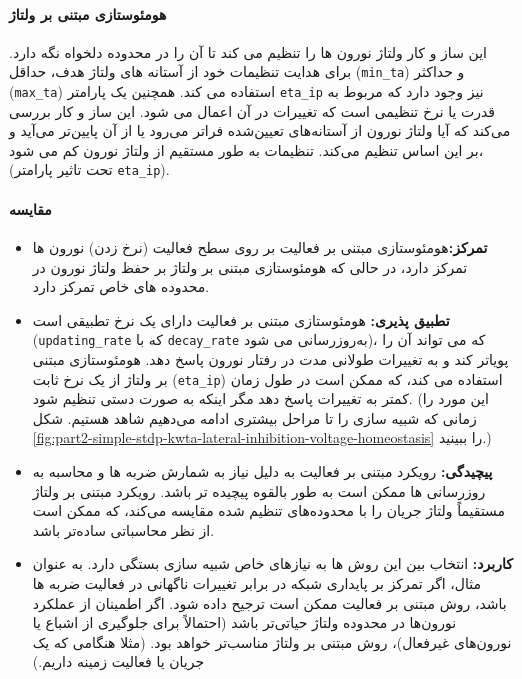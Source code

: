             \paragraph*{هومئوستازی مبتنی بر ولتاژ}
            این ساز و کار ولتاژ نورون ها را تنظیم می کند تا آن را در محدوده دلخواه نگه دارد. برای هدایت تنظیمات خود از آستانه های ولتاژ هدف، حداقل
            (\texttt{min\_ta})
            و حداکثر
            (\texttt{max\_ta})
            استفاده می کند. همچنین یک پارامتر 
            \texttt{eta\_ip} 
            نیز وجود دارد که مربوط به قدرت یا نرخ تنظیمی است که تغییرات در آن اعمال می شود. این ساز و کار بررسی می‌کند که آیا ولتاژ نورون از آستانه‌های تعیین‌شده فراتر می‌رود یا از آن پایین‌تر می‌آید و بر این اساس تنظیم می‌کند. تنظیمات به طور مستقیم از ولتاژ نورون کم می شود، 
            (تحت تاثیر پارامتر 
            \texttt{eta\_ip}).

            \paragraph*{مقایسه}
            \begin{itemize}
                \item \textbf{تمرکز:}هومئوستازی مبتنی بر فعالیت بر روی سطح فعالیت 
                (نرخ زدن) 
                نورون ها تمرکز دارد، در حالی که هومئوستازی مبتنی بر ولتاژ بر حفظ ولتاژ نورون در محدوده های خاص تمرکز دارد.
                \item \textbf{تطبیق پذیری:} هومئوستازی مبتنی بر فعالیت دارای یک نرخ تطبیقی ​​است 
                (\texttt{updating\_rate}
                که با 
                \texttt{decay\_rate} 
                به‌روزرسانی می شود)، 
                که می تواند آن را پویاتر کند و به تغییرات طولانی مدت در رفتار نورون پاسخ دهد. هومئوستازی مبتنی بر ولتاژ از یک نرخ ثابت 
                (\texttt{eta\_ip}) 
                استفاده می کند، که ممکن است در طول زمان کمتر به تغییرات پاسخ دهد مگر اینکه به صورت دستی تنظیم شود. 
                (این مورد را زمانی که شبیه سازی را تا مراحل بیشتری ادامه می‌دهیم شاهد هستیم. شکل 
                \ref{fig:part2-simple-stdp-kwta-lateral-inhibition-voltage-homeostasis} 
                را ببینید.)
                \item \textbf{پیچیدگی:} رویکرد مبتنی بر فعالیت به دلیل نیاز به شمارش ضربه ها و محاسبه به روزرسانی ها ممکن است به طور بالقوه پیچیده تر باشد. رویکرد مبتنی بر ولتاژ مستقیماً ولتاژ جریان را با محدوده‌های تنظیم شده مقایسه می‌کند، که ممکن است از نظر محاسباتی ساده‌تر باشد.
                \item \textbf{کاربرد:} انتخاب بین این روش ها به نیازهای خاص شبیه سازی بستگی دارد. به عنوان مثال، اگر تمرکز بر پایداری شبکه در برابر تغییرات ناگهانی در فعالیت ضربه ها باشد، روش مبتنی بر فعالیت ممکن است ترجیح داده شود. اگر اطمینان از عملکرد نورون‌ها در محدوده ولتاژ حیاتی‌تر باشد (احتمالاً برای جلوگیری از اشباع یا نورون‌های غیرفعال)،
                 روش مبتنی بر ولتاژ مناسب‌تر خواهد بود.
                 (مثلا هنگامی که یک جریان یا فعالیت زمینه داریم.)
            \end{itemize}

